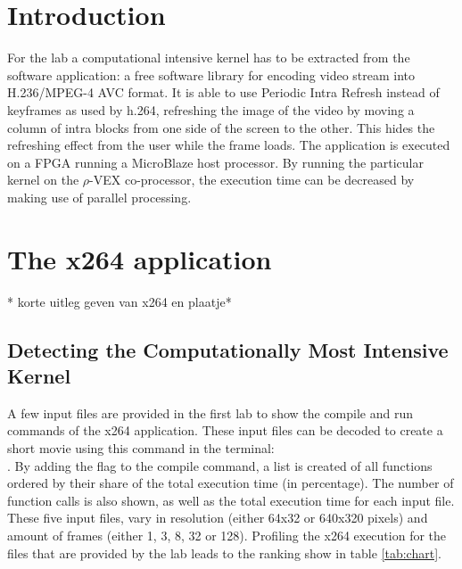 \section{Introduction}
For the lab a computational intensive kernel has to be extracted from the  software application: a free software library for encoding video stream into H.236/MPEG-4 AVC format. It is able to use Periodic Intra Refresh instead of keyframes as used by h.264, refreshing the image of the video by moving a column of intra blocks from one side of the screen to the other. This hides the refreshing effect from the user while the frame loads. The  application is executed on a FPGA running a MicroBlaze host processor. By running the particular kernel on the $\rho$-VEX co-processor, the execution time can be decreased by making use of parallel processing. 


\section{The x264 application}
* korte uitleg geven van x264 en plaatje* 

\subsection{Detecting the Computationally Most Intensive Kernel}
A few input files are provided in the first lab to show the compile and run commands of the x264 application. These  input files can be decoded to create a short  movie using this command in the terminal: \\
. By adding the  flag to the compile command, a list is created of all functions ordered by their share of the total execution time (in percentage). The number of function calls is also shown, as well as the total execution time for each input file. These five input  files, vary in resolution (either 64x32 or 640x320 pixels) and amount of frames (either 1, 3, 8, 32 or 128). Profiling the x264 execution for the  files that are provided by the lab leads to the ranking show in table \ref{tab:chart}.

